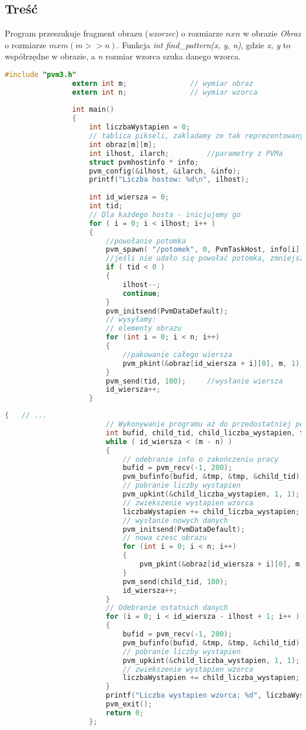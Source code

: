 			\subsection{Treść}
				Program przeszukuje fragment obrazu (\textit{wzorzec}) o rozmiarze $ nxn $ w obrazie \textit{Obraz} o rozmiarze $ mxm (m>>n) $. 
				Funkcja \textit{int find\_pattern(x, y, n)}, gdzie \textit{x, y} to współrzędne w obrazie, a \textit{n} rozmiar wzorca szuka danego wzorca.
				\begin{lstlisting}[language=C]
				#include "pvm3.h"
				extern int m;				// wymiar obraz
				extern int n;				// wymiar wzorca
				
				int main()
				{
					int liczbaWystapien = 0;
					// tablica pikseli, zakladamy ze tak reprezentowany jest obraz
					int obraz[m][m];		
					int ilhost, ilarch;			//parametry z PVMa
					struct pvmhostinfo * info;
					pvm_config(&ilhost, &ilarch, &info);
					printf("Liczba hostow: %d\n", ilhost);
					
					int id_wiersza = 0;
					int tid;
					// Dla każdego hosta - inicjujemy go
					for ( i = 0; i < ilhost; i++ )
					{
						//powołanie potomka
						pvm_spawn( "/potomek", 0, PvmTaskHost, info[i].hi_name, 1, &tid);
						//jeśli nie udało się powołać potomka, zmniejszamy liczbę hostów i kontynuujemy	
						if ( tid < 0 )
						{
							ilhost--;	
							continue;
						}
						pvm_initsend(PvmDataDefault);
						// wysyłamy:
						// elementy obrazu
						for (int i = 0; i < n; i++)
						{
							//pakowanie całego wiersza
							pvm_pkint(&obraz[id_wiersza + i][0], m, 1);
						}
						pvm_send(tid, 100);		//wysłanie wiersza
						id_wiersza++;
					}
				\end{lstlisting}
				\newpage
				\begin{lstlisting}[language=C]
					{ 	// ...
						// Wykonywanie programu aż do przedostatniej pętli
						int bufid, child_tid, child_liczba_wystapien, tmp;
						while ( id_wiersza < (m - n) )
						{
							// odebranie info o zakończeniu pracy
							bufid = pvm_recv(-1, 200);
							pvm_bufinfo(bufid, &tmp, &tmp, &child_tid);
							// pobranie liczby wystapien
							pvm_upkint(&child_liczba_wystapien, 1, 1);
							// zwiekszenie wystapien wzorca
							liczbaWystapien += child_liczba_wystapien;
							// wysłanie nowych danych
							pvm_initsend(PvmDataDefault);
							// nowa czesc obrazu
							for (int i = 0; i < n; i++)
							{
								pvm_pkint(&obraz[id_wiersza + i][0], m, 1);
							}
							pvm_send(child_tid, 100);
							id_wiersza++;
						}
						// Odebranie ostatnich danych
						for	(i = 0; i < id_wiersza - ilhost + 1; i++ )
						{
							bufid = pvm_recv(-1, 200);
							pvm_bufinfo(bufid, &tmp, &tmp, &child_tid);
							// pobranie liczby wystapien
							pvm_upkint(&child_liczba_wystapien, 1, 1);
							// zwiekszenie wystapien wzorca
							liczbaWystapien += child_liczba_wystapien;
						}
						printf("Liczba wystapien wzorca: %d", liczbaWystapien);
						pvm_exit();
						return 0;
					};
				\end{lstlisting}
